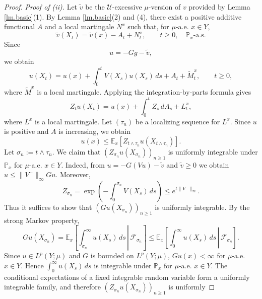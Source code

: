 \documentclass[11pt,a4paper,reqno]{amsart}
\theoremstyle{definition}
\numberwithin{equation}{section}
\begin{document}
\begin{proof}
\smallskip
\noindent
\textit{Proof of (ii).}
Let $\tilde v$ be the $\mathcal U$-excessive $\mu$-version of $v$
provided by Lemma \ref{lm.basic}(1). By Lemma \ref{lm.basic}(2) and
(4), there exist a positive additive functional $A$ and a local
martingale $N^x$ such that, for $\mu$-a.e. $x\in Y$,
\begin{equation*}
\tilde v(X_t)=\tilde v(x)-A_t+N_t^x,\qquad t\ge0,\quad \mathbb P_x\text{-a.s.}
\end{equation*}
Since
\begin{equation*}
u=-Gg-\tilde v,
\end{equation*}
we obtain
\begin{equation*}
u(X_t)=u(x)+\int_0^tV(X_s)u(X_s)\,ds+A_t+\widetilde M_t^x,\qquad t\ge0,
\end{equation*}
where $\widetilde M^x$ is a local martingale. Applying the
integration-by-parts formula gives
\begin{equation*}
Z_tu(X_t)=u(x)+\int_0^t Z_s\,dA_s+L_t^x,
\end{equation*}
where $L^x$ is a local martingale.
Let $(\tau_n)$ be a localizing sequence for $L^x$. Since $u$ is
positive and $A$ is increasing, we obtain
\begin{equation}
\label{eq.ineq915}
u(x)\le\mathbb E_x\left[Z_{t\wedge\tau_n}u(X_{t\wedge\tau_n})\right].
\end{equation}
Let $\sigma_n:=t\wedge\tau_n$. We claim that
$(Z_{\sigma_n}u(X_{\sigma_n}))_{n\ge1}$ is uniformly integrable
under $\mathbb P_x$ for $\mu$-a.e. $x\in Y$. Indeed, from
$u=-G(Vu)-\tilde v$ and $\tilde v\ge0$ we obtain $u\le \|V^-\|_\infty Gu$.
Moreover,
\begin{equation*}
Z_{\sigma_n}=\exp\left(-\int_0^{\sigma_n}V(X_s)\,ds\right)\le e^{t\|V^-\|_\infty}.
\end{equation*}
Thus it suffices to show that
$(Gu(X_{\sigma_n}))_{n\ge1}$ is uniformly integrable. By the strong
Markov property,
\begin{equation*}
Gu(X_{\sigma_n})=\mathbb E_x\left[\left.\int_{\sigma_n}^{\infty}u(X_s)\,ds\,\right|\,\mathcal F_{\sigma_n}\right]
\le
\mathbb E_x\left[\left.\int_0^{\infty}u(X_s)\,ds\,\right|\,\mathcal F_{\sigma_n}\right].
\end{equation*}
Since $u\in L^p(Y;\mu)$ and $G$ is bounded on $L^p(Y;\mu)$,
$Gu(x)<\infty$ for $\mu$-a.e. $x\in Y$. Hence
$\int_0^\infty u(X_s)\,ds$ is integrable under $\mathbb P_x$ for
$\mu$-a.e. $x\in Y$. The conditional expectations of a fixed
integrable random variable form a uniformly integrable family, and
therefore $(Z_{\sigma_n}u(X_{\sigma_n}))_{n\ge1}$ is uniformly

\end{proof}
\end{document}
